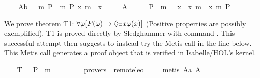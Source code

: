 \begin{isabellebody}
\ \ \ \ A{}b{\isacharcolon}\ {\isachardoublequoteopen}{\isacharbrackleft}{\isasymPi}\ {\isacharparenleft}{\isasymlambda}{\isasymPhi}{\isachardot}\ m{\isasymnot}\ {\isacharparenleft}P\ {\isasymPhi}{\isacharparenright}\ m{\isasymRightarrow}\ P\ {\isacharparenleft}{\isasymlambda}x{\isachardot}\ m{\isasymnot}\ {\isacharparenleft}{\isasymPhi}\ x{\isacharparenright}{\isacharparenright}{\isacharparenright}{\isacharbrackright}{\isachardoublequoteclose}\ \isanewline
\ \ \ \ A{}{\isacharcolon}\ \ {\isachardoublequoteopen}{\isacharbrackleft}{\isasymPi}\ {\isacharparenleft}{\isasymlambda}{\isasymPhi}{\isachardot}\ {\isasymPi}\ {\isacharparenleft}{\isasymlambda}{\isasympsi}{\isachardot}\ {\isacharparenleft}P\ {\isasymPhi}\ m{\isasymand}\ {\isasymbox}\ {\isacharparenleft}{\isasymforall}\ {\isacharparenleft}{\isasymlambda}x{\isachardot}\ {\isasymPhi}\ x\ m{\isasymRightarrow}\ {\isasympsi}\ x{\isacharparenright}{\isacharparenright}{\isacharparenright}\ m{\isasymRightarrow}\ P\ {\isasympsi}{\isacharparenright}{\isacharparenright}{\isacharbrackright}{\isachardoublequoteclose}%
\begin{isamarkuptext}%
We prove theorem T1: $\forall \varphi [P(\varphi) \rightarrow \Diamond \exists x \varphi(x)]$ (Positive 
properties are possibly exemplified). T1 is proved directly by Sledghammer with command . This successful attempt then suggests to 
instead try the Metis call in the line below. This Metis call generates a proof object 
that is verified in Isabelle/HOL's kernel.%
\end{isamarkuptext}%
\isamarkuptrue%
\ \ \isamarkupfalse%
\ T{}{\isacharcolon}\ {\isachardoublequoteopen}{\isacharbrackleft}{\isasymPi}\ {\isacharparenleft}{\isasymlambda}{\isasymPhi}{\isachardot}\ P\ {\isasymPhi}\ m{\isasymRightarrow}\ {\isasymdiamond}\ {\isacharparenleft}{\isasymexists}\ {\isasymPhi}{\isacharparenright}{\isacharparenright}{\isacharbrackright}{\isachardoublequoteclose}\ \ \isanewline
\ \ \isamarkupfalse%
\ {\isacharbrackleft}provers\ {\isacharequal}\ remote{\isacharunderscore}leo{}{\isacharbrackright}\ \isanewline
%
\isadelimproof
\ \ %
\endisadelimproof
%
\isatagproof
{}\isamarkupfalse%
\ {\isacharparenleft}metis\ A{}a\ A{}{\isacharparenright}%
\endisatagproof
{\isafoldproof}%
%
\isadelimproof
%
\endisadelimproof
%
\begin{isamarkuptext}%

\end{isamarkuptext}
\end{isabellebody}
